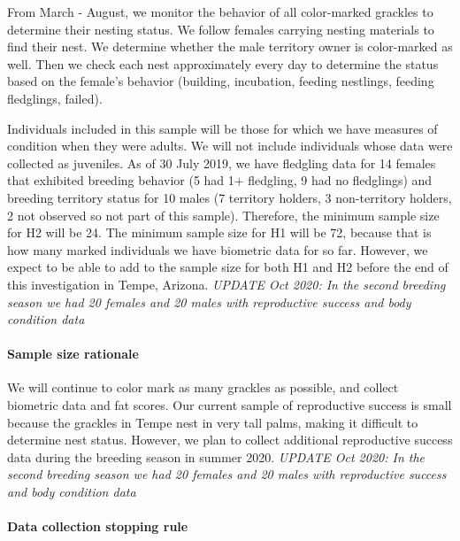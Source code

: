 \documentclass[
]{article}
\begin{document}
From March - August, we monitor the behavior of all color-marked
grackles to determine their nesting status. We follow females carrying
nesting materials to find their nest. We determine whether the male
territory owner is color-marked as well. Then we check each nest
approximately every day to determine the status based on the female's
behavior (building, incubation, feeding nestlings, feeding fledglings,
failed).

Individuals included in this sample will be those for which we have
measures of condition when they were adults. We will not include
individuals whose data were collected as juveniles. As of 30 July 2019,
we have fledgling data for 14 females that exhibited breeding behavior
(5 had 1+ fledgling, 9 had no fledglings) and breeding territory status
for 10 males (7 territory holders, 3 non-territory holders, 2 not
observed so not part of this sample). Therefore, the minimum sample size
for H2 will be 24. The minimum sample size for H1 will be 72, because
that is how many marked individuals we have biometric data for so far.
However, we expect to be able to add to the sample size for both H1 and
H2 before the end of this investigation in Tempe, Arizona. \emph{UPDATE
Oct 2020: In the second breeding season we had 20 females and 20 males
with reproductive success and body condition data}

\hypertarget{sample-size-rationale}{%
\paragraph{\texorpdfstring{\textbf{Sample size
rationale}}{Sample size rationale}}\label{sample-size-rationale}}

We will continue to color mark as many grackles as possible, and collect
biometric data and fat scores. Our current sample of reproductive
success is small because the grackles in Tempe nest in very tall palms,
making it difficult to determine nest status. However, we plan to
collect additional reproductive success data during the breeding season
in summer 2020. \emph{UPDATE Oct 2020: In the second breeding season we
had 20 females and 20 males with reproductive success and body condition
data}

\hypertarget{data-collection-stopping-rule}{%
\paragraph{\texorpdfstring{\textbf{Data collection stopping
rule}}{Data collection stopping rule}}\label{data-collection-stopping-rule}}
\end{document}
